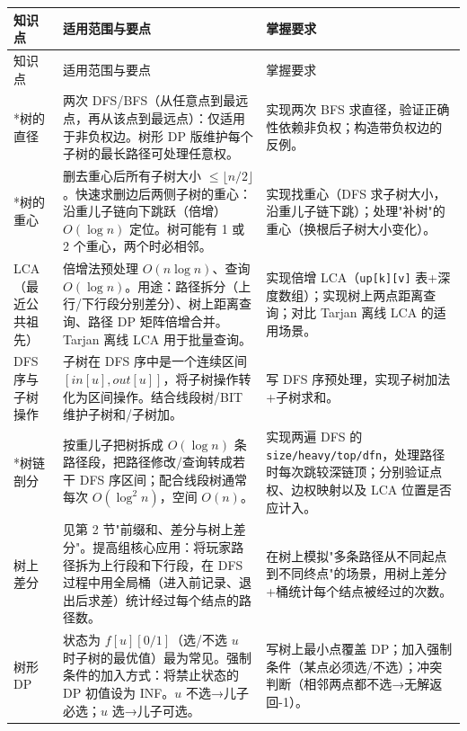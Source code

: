 \documentclass[a4paper,11pt]{article}
\newcommand{\code}[1]{\texttt{#1}}
\begin{document}
\begin{longtable}{L{2.4cm} L{7.5cm} L{6.8cm}}
\toprule
知识点 & 适用范围与要点 & 掌握要求 \\
\midrule
\endfirsthead
\toprule
知识点 & 适用范围与要点 & 掌握要求 \\
\midrule
\endhead
\endfoot
\bottomrule
\endlastfoot

*树的直径
& 两次 DFS/BFS（从任意点到最远点，再从该点到最远点）：仅适用于非负权边。树形 DP 版维护每个子树的最长路径可处理任意权。
& 实现两次 BFS 求直径，验证正确性依赖非负权；构造带负权边的反例。\\[2mm]

*树的重心
& 删去重心后所有子树大小 $\le\lfloor n/2\rfloor$。快速求删边后两侧子树的重心：沿重儿子链向下跳跃（倍增）$O(\log n)$ 定位。树可能有 1 或 2 个重心，两个时必相邻。
& 实现找重心（DFS 求子树大小，沿重儿子链下跳）；处理"补树"的重心（换根后子树大小变化）。\\[2mm]

LCA（最近公共祖先）
& 倍增法预处理 $O(n\log n)$、查询 $O(\log n)$。用途：路径拆分（上行/下行段分别差分）、树上距离查询、路径 DP 矩阵倍增合并。Tarjan 离线 LCA 用于批量查询。
& 实现倍增 LCA（\code{up[k][v]} 表+深度数组）；实现树上两点距离查询；对比 Tarjan 离线 LCA 的适用场景。\\[2mm]

DFS 序与子树操作
& 子树在 DFS 序中是一个连续区间 $[in[u],out[u]]$，将子树操作转化为区间操作。结合线段树/BIT 维护子树和/子树加。
& 写 DFS 序预处理，实现子树加法+子树求和。\\[2mm]

*树链剖分
& 按重儿子把树拆成 $O(\log n)$ 条路径段，把路径修改/查询转成若干 DFS 序区间；配合线段树通常每次 $O(\log^2 n)$，空间 $O(n)$。
& 实现两遍 DFS 的 \code{size/heavy/top/dfn}，处理路径时每次跳较深链顶；分别验证点权、边权映射以及 LCA 位置是否应计入。\\[2mm]

树上差分
& 见第 2 节"前缀和、差分与树上差分"。提高组核心应用：将玩家路径拆为上行段和下行段，在 DFS 过程中用全局桶（进入前记录、退出后求差）统计经过每个结点的路径数。
& 在树上模拟"多条路径从不同起点到不同终点"的场景，用树上差分+桶统计每个结点被经过的次数。\\[2mm]

树形 DP
& 状态为 $f[u][0/1]$（选/不选 $u$ 时子树的最优值）最为常见。强制条件的加入方式：将禁止状态的 DP 初值设为 INF。$u$ 不选→儿子必选；$u$ 选→儿子可选。
& 写树上最小点覆盖 DP；加入强制条件（某点必须选/不选）；冲突判断（相邻两点都不选→无解返回-1）。\\[2mm]


\end{longtable}
\end{document}

